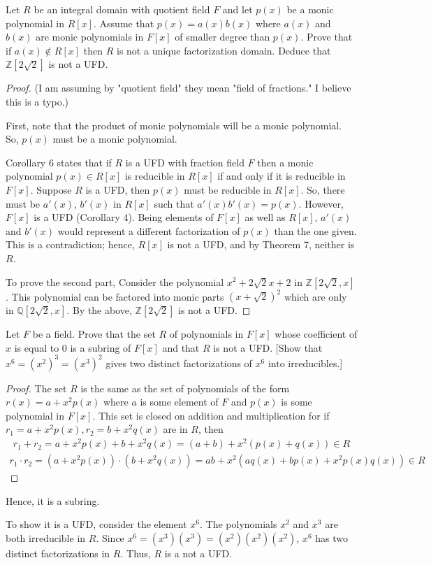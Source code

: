\documentclass[10pt]{article}
\newenvironment{problem}[2][Problem]{\begin{trivlist}
		\item[\hskip \labelsep {\bfseries #1}\hskip \labelsep {\bfseries #2.}]}{\end{trivlist}}
\begin{document}
	\begin{problem}{3.1} 
		Let $R$ be an integral domain with quotient field $F$ and let $p(x)$ be a monic polynomial in $R[x]$. Assume that $p(x) = a(x)b(x)$ where $a(x)$ and $b(x)$ are monic polynomials in $F[x]$ of smaller degree than $p(x)$. Prove that if $a(x) \not \in R[x]$ then $R$ is not a unique factorization domain. Deduce that $\mathbb{Z}[2 \sqrt{2}]$ is not a UFD.
		\begin{proof}
			(I am assuming by "quotient field" they mean "field of fractions." I believe this is a typo.) 
			
			
			First, note that the product of monic polynomials will be a monic polynomial. So, $p(x)$ must be a monic polynomial.
			
			Corollary 6 states that if $R$ is a UFD with fraction field $F$ then a monic polynomial $p(x)\in R[x]$ is reducible in $R[x]$ if and only if it is reducible in $F[x]$. Suppose $R$ is a UFD, then $p(x)$ must be reducible in $R[x]$. So, there must be $a'(x)$, $b'(x)$ in $R[x]$ such that $a'(x)b'(x) = p(x)$. However, $F[x]$ is a UFD (Corollary 4). Being elements of $F[x]$ as well as $R[x]$, $a'(x)$ and $b'(x)$ would represent a different factorization of $p(x)$ than the one given. This is a contradiction; hence, $R[x]$ is not a UFD, and by Theorem 7, neither is $R$.
			
			To prove the second part, Consider the polynomial $x^2 + 2\sqrt{2}x + 2$ in $\mathbb{Z}[2\sqrt{2},x]$. This polynomial can be factored into monic parts $(x + \sqrt{2})^2$ which are only in $\mathbb{Q}[2\sqrt{2},x]$. By the above, $\mathbb{Z}[2\sqrt{2}]$ is not a UFD.
		\end{proof}
	\end{problem}
	
	\begin{problem}{3.3}
		Let $F$ be a field. Prove that the set $R$ of polynomials in $F[x]$ whose coefficient of $x$ is equal to $0$ is a subring of $F[x]$ and that $R$ is not a UFD. [Show that $x^6=(x^2)^3=(x^3)^2$ gives two distinct factorizations of $x^6$ into irreducibles.]
		\begin{proof}
			The set $R$ is the same as the set of polynomials of the form $r(x) = a + x^2p(x)$ where $a$ is some element of $F$ and $p(x)$ is some polynomial in $F[x]$. This set is closed on addition and multiplication for if $r_1 = a+x^2p(x), r_2=b+x^2q(x)$ are in $R$, then 
			\begin{align*}
				r_1+r_2 = a+x^2p(x) + b+x^2q(x) = (a+b) + x^2(p(x) + q(x)) \in R
			\end{align*}
			\begin{align*}
				r_1 \cdot r_2 = (a+x^2p(x)) \cdot (b+x^2q(x)) = ab + x^2(aq(x) + bp(x) + x^2p(x)q(x)) \in R
			\end{align*}
		\end{proof}
		Hence, it is a subring.
		
		To show it is a UFD, consider the element $x^6$. The polynomials $x^2$ and $x^3$ are both irreducible in $R$. Since $x^6 = (x^3)(x^3) = (x^2)(x^2)(x^2)$, $x^6$ has two distinct factorizations in $R$. Thus, $R$ is a not a UFD.
	\end{problem}
\end{document}
